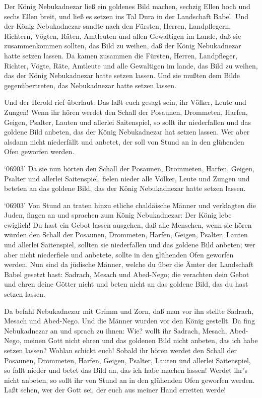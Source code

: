  Der König Nebukadnezar ließ ein goldenes Bild machen,
sechzig Ellen hoch und sechs Ellen breit, und ließ es setzen ins Tal
Dura in der Landschaft Babel.  Und der König Nebukadnezar
sandte nach den Fürsten, Herren, Landpflegern, Richtern, Vögten, Räten,
Amtleuten und allen Gewaltigen im Lande, daß sie zusammenkommen sollten,
das Bild zu weihen, daß der König Nebukadnezar hatte setzen lassen.
 Da kamen zusammen die Fürsten, Herren, Landpfleger,
Richter, Vögte, Räte, Amtleute und alle Gewaltigen im lande, das Bild zu
weihen, das der König Nebukadnezar hatte setzen lassen. Und sie mußten
dem Bilde gegenübertreten, das Nebukadnezar hatte setzen lassen.

 Und der Herold rief überlaut: Das laßt euch gesagt sein,
ihr Völker, Leute und Zungen!  Wenn ihr hören werdet den
Schall der Posaunen, Drommeten, Harfen, Geigen, Psalter, Lauten und
allerlei Saitenspiel, so sollt ihr niederfallen und das goldene Bild
anbeten, das der König Nebukadnezar hat setzen lassen.  Wer
aber alsdann nicht niederfällt und anbetet, der soll von Stund an in den
glühenden Ofen geworfen werden.

 `06903' Da sie nun hörten den Schall der Posaunen,
Drommeten, Harfen, Geigen, Psalter und allerlei Saitenspiel, fielen
nieder alle Völker, Leute und Zungen und beteten an das goldene Bild,
das der König Nebukadnezar hatte setzen lassen.

 `06903' Von Stund an traten hinzu etliche chaldäische
Männer und verklagten die Juden,  fingen an und sprachen zum
König Nebukadnezar: Der König lebe ewiglich!  Du hast ein
Gebot lassen ausgehen, daß alle Menschen, wenn sie hören würden den
Schall der Posaunen, Drommeten, Harfen, Geigen, Psalter, Lauten und
allerlei Saitenspiel, sollten sie niederfallen und das goldene Bild
anbeten;  wer aber nicht niederfiele und anbetete, sollte
in den glühenden Ofen geworfen werden.  Nun sind da
jüdische Männer, welche du über die Ämter der Landschaft Babel gesetzt
hast: Sadrach, Mesach und Abed-Nego; die verachten dein Gebot und ehren
deine Götter nicht und beten nicht an das goldene Bild, das du hast
setzen lassen.

 Da befahl Nebukadnezar mit Grimm und Zorn, daß man vor ihn
stellte Sadrach, Mesach und Abed-Nego. Und die Männer wurden vor den
König gestellt.  Da fing Nebukadnezar an und sprach zu
ihnen: Wie? wollt ihr Sadrach, Mesach, Abed-Nego, meinen Gott nicht
ehren und das goldenen Bild nicht anbeten, das ich habe setzen lassen?
 Wohlan schickt euch! Sobald ihr hören werdet den Schall
der Posaunen, Drommeten, Harfen, Geigen, Psalter, Lauten und allerlei
Saitenspiel, so fallt nieder und betet das Bild an, das ich habe machen
lassen! Werdet ihr's nicht anbeten, so sollt ihr von Stund an in den
glühenden Ofen geworfen werden. Laßt sehen, wer der Gott sei, der euch
aus meiner Hand erretten werde!

